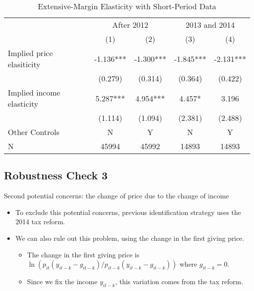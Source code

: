 \documentclass[ review  , 3p ]{elsarticle}
\providecommand{\tightlist}{%
  \setlength{\itemsep}{0pt}\setlength{\parskip}{0pt}}
\begin{document}
  \begin{table}

  \caption{\label{tab:kableShortElasticity2Slide2}Extensive-Margin Elasticity with Short-Period Data}
  \centering
  \fontsize{8}{10}\selectfont
  \begin{tabular}[t]{lcccc}
  \toprule
  \multicolumn{1}{c}{ } & \multicolumn{2}{c}{After 2012} & \multicolumn{2}{c}{2013 and 2014} \\
  \cmidrule(l{3pt}r{3pt}){2-3} \cmidrule(l{3pt}r{3pt}){4-5}
   & (1) & (2) & (3) & (4)\\
  \midrule
  Implied price elasiticity & -1.136*** & -1.300*** & -1.845*** & -2.131***\\
   & (0.279) & (0.314) & (0.364) & (0.422)\\
  Implied income elasticity & 5.287*** & 4.954*** & 4.457* & 3.196\\
   & (1.114) & (1.094) & (2.381) & (2.488)\\
  Other Controls & N & Y & N & Y\\
  N & 45994 & 45992 & 14893 & 14893\\
  \bottomrule
  \end{tabular}
  \end{table}

  \hypertarget{robustness-check-3}{%
  \subsection{Robustness Check 3}\label{robustness-check-3}}

  Second potential concerns: the change of price due to the change of income

  \begin{itemize}
  \tightlist
  \item
    To exclude this potential concerns, previous identification strategy uses the 2014 tax reform.
  \item
    We can also rule out this problem, using the change in the first giving price.

    \begin{itemize}
    \tightlist
    \item
      The change in the first giving price is \(\ln(p_{it}(y_{it-k} - g_{it-k})/p_{it-k}(y_{it-k} - g_{it-k}))\) where \(g_{it-k} = 0\).
    \item
      Since we fix the income \(y_{it-k}\), this variation comes from the tax reform.
    \end{itemize}
  \end{itemize}
\end{document}
